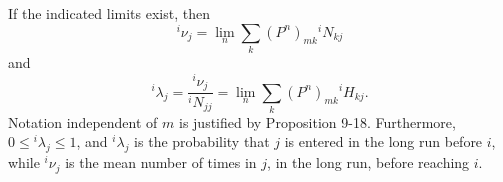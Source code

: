If the indicated limits exist, then
$${}^i\nu_j = \lim_n \sum_k (P^n)_{mk} {}^iN_{kj}$$
and
$${}^i\lambda_j = \frac{{}^i\nu_j}{{}^iN_{jj}} = \lim_n \sum_k (P^n)_{mk} {}^iH_{kj}.$$
Notation independent of $m$ is justified by Proposition 9-18. Furthermore, $0 \leq {}^i\lambda_j \leq 1$, and ${}^i\lambda_j$ is the probability that $j$ is entered in the long run before $i$, while ${}^i\nu_j$ is the mean number of times in $j$, in the long run, before reaching $i$.
